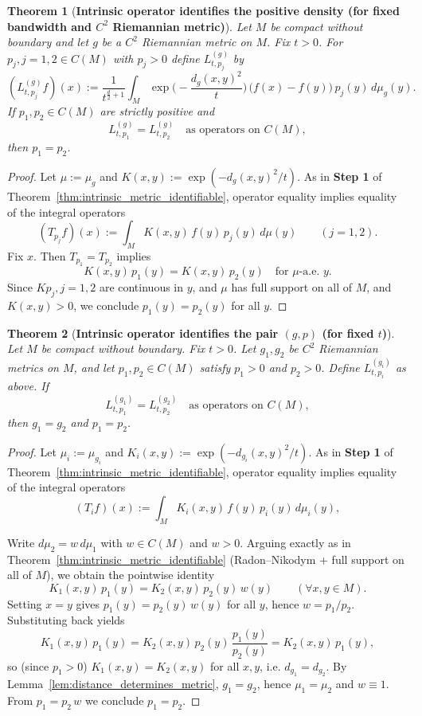 \documentclass{amsart}
\newtheorem{theorem}{Theorem}[section]
\theoremstyle{definition}
\theoremstyle{remark}
\newcommand{\nd}{\noindent}
\newcommand{\0}{\boldsymbol{0}}
\begin{document}
\begin{theorem}[\textbf{Intrinsic operator identifies the positive density (for fixed bandwidth and $C^2$ Riemannian metric)}]
\label{thm:intrinsic_density_identifiable}
Let $M$ be compact without boundary and let $g$ be a $C^2$ Riemannian metric on $M$.
Fix $t>0$. For $p_j, j=1, 2\in C(M)$ with $p_j>0$ define $L^{(g)}_{t,p_j}$ by
\[
(L^{(g)}_{t,p_j} f)(x)
:=\frac{1}{t^{\frac d2+1}}\int_M \exp\!\Big(-\frac{d_g(x,y)^2}{t}\Big)\,\bigl(f(x)-f(y)\bigr)\,p_j(y)\,d\mu_g(y).
\]
If $p_1,p_2\in C(M)$ are strictly positive and
\[
L^{(g)}_{t,p_1}=L^{(g)}_{t,p_2}\quad\text{as operators on }C(M),
\]
then $p_1=p_2$.
\end{theorem}

\begin{proof}
Let $\mu:=\mu_g$ and $K(x,y):=\exp(-d_g(x,y)^2/t)$.
As in \textbf{Step 1} of Theorem~\ref{thm:intrinsic_metric_identifiable}, operator equality implies equality of the
integral operators
\[
(T_{p_j}f)(x):=\int_M K(x,y)\,f(y)\,p_j(y)\,d\mu(y)\qquad (j=1,2).
\]
Fix $x$. Then $T_{p_1}=T_{p_2}$ implies 
\[
K(x,y)\,p_1(y)=K(x,y)\,p_2(y)\quad\text{for $\mu$-a.e.\ }y.
\]
Since $Kp_j, j=1, 2$ are continuous in $y$, and $\mu$ has full support on all of $M$, and $K(x,y)>0$, we conclude $p_1(y)=p_2(y)$ for all $y$.
\end{proof}


\begin{theorem}[\textbf{Intrinsic operator identifies the pair $(g,p)$ (for fixed $t$)}]
\label{thm:intrinsic_joint_identifiable}
Let $M$ be compact without boundary. Fix $t>0$.
Let $g_1,g_2$ be $C^2$ Riemannian metrics on $M$, and let $p_1,p_2\in C(M)$ satisfy $p_1>0$ and $p_2>0$.
Define $L^{(g_i)}_{t,p_i}$ as above.
If
\[
L^{(g_1)}_{t,p_1}=L^{(g_2)}_{t,p_2}\quad\text{as operators on }C(M),
\]
then $g_1=g_2$ and $p_1=p_2$.
\end{theorem}

\begin{proof}
Let $\mu_i:=\mu_{g_i}$ and $K_i(x,y):=\exp(-d_{g_i}(x,y)^2/t)$.
As in \textbf{Step 1 }of Theorem~\ref{thm:intrinsic_metric_identifiable}, operator equality implies equality of the
integral operators
\[
(T_i f)(x):=\int_M K_i(x,y)\,f(y)\,p_i(y)\,d\mu_i(y),
\]

\nd Write $d\mu_2=w\,d\mu_1$ with $w\in C(M)$ and $w>0$.
Arguing exactly as in Theorem~\ref{thm:intrinsic_metric_identifiable} (Radon--Nikodym + full support on all of $M$),
we obtain the pointwise identity
\[
K_1(x,y)\,p_1(y)=K_2(x,y)\,p_2(y)\,w(y)\qquad(\forall x,y\in M).
\]
Setting $x=y$ gives $p_1(y)=p_2(y)\,w(y)$ for all $y$, hence $w=p_1/p_2$.
Substituting back yields
\[
K_1(x,y)\,p_1(y)=K_2(x,y)\,p_2(y)\,\frac{p_1(y)}{p_2(y)}=K_2(x,y)\,p_1(y),
\]
so (since $p_1>0$) $K_1(x,y)=K_2(x,y)$ for all $x,y$, i.e. $d_{g_1}=d_{g_2}$.
By Lemma~\ref{lem:distance_determines_metric}, $g_1=g_2$, hence $\mu_1=\mu_2$ and $w\equiv 1$.
From $p_1=p_2\,w$ we conclude $p_1=p_2$.
\end{proof}
\end{document}

